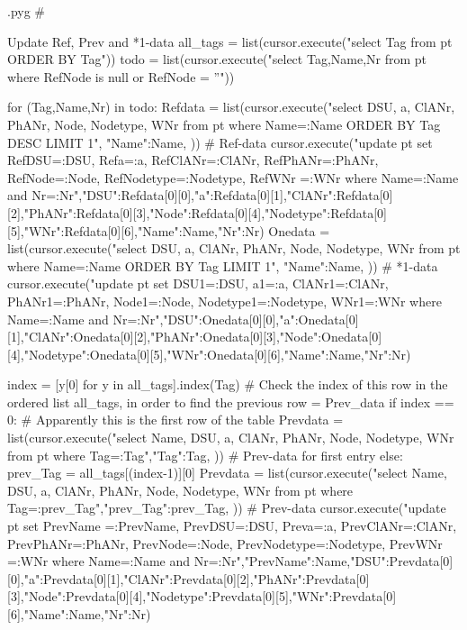 \documentclass{report}
\makeatletter
\newenvironment{python}{%
  \VerbatimEnvironment
  \minted@resetoptions
  \setkeys{minted@opt}{}
      \begin{VerbatimOut}{\jobname.pyg}}
{%
      \end{VerbatimOut}
      \minted@pygmentize{python}
      \DeleteFile{\jobname.pyg}}
\makeatother
\begin{document}
\begin{python}
#{{{ Update Ref, Prev and *1-data
all_tags = list(cursor.execute("select Tag from pt ORDER BY Tag"))
todo = list(cursor.execute("select Tag,Name,Nr from pt where RefNode is null or RefNode = ''"))

for (Tag,Name,Nr) in todo:
    Refdata = list(cursor.execute("select DSU, a, ClANr, PhANr, Node, Nodetype, WNr from pt where Name=:Name ORDER BY Tag DESC LIMIT 1", {"Name":Name, })) # Ref-data
    cursor.execute("update pt set RefDSU=:DSU, Refa=:a, RefClANr=:ClANr, RefPhANr=:PhANr, RefNode=:Node, RefNodetype=:Nodetype, RefWNr =:WNr where Name=:Name and Nr=:Nr",{"DSU":Refdata[0][0],"a":Refdata[0][1],"ClANr":Refdata[0][2],"PhANr":Refdata[0][3],"Node":Refdata[0][4],"Nodetype":Refdata[0][5],"WNr":Refdata[0][6],"Name":Name,"Nr":Nr}) 
    Onedata = list(cursor.execute("select DSU, a, ClANr, PhANr, Node, Nodetype, WNr from pt where Name=:Name ORDER BY Tag LIMIT 1", {"Name":Name, })) # *1-data
    cursor.execute("update pt set DSU1=:DSU, a1=:a, ClANr1=:ClANr, PhANr1=:PhANr, Node1=:Node, Nodetype1=:Nodetype, WNr1=:WNr where Name=:Name and Nr=:Nr",{"DSU":Onedata[0][0],"a":Onedata[0][1],"ClANr":Onedata[0][2],"PhANr":Onedata[0][3],"Node":Onedata[0][4],"Nodetype":Onedata[0][5],"WNr":Onedata[0][6],"Name":Name,"Nr":Nr}) 

    index = [y[0] for y in all_tags].index(Tag)  # Check the index of this row in the ordered list all_tags, in order to find the previous row = Prev_data 
    if index == 0:  # Apparently this is the first row of the table
        Prevdata = list(cursor.execute("select Name, DSU, a, ClANr, PhANr, Node, Nodetype, WNr from pt where Tag=:Tag",{"Tag":Tag, })) # Prev-data for first entry
    else:
        prev_Tag = all_tags[(index-1)][0]
        Prevdata = list(cursor.execute("select Name, DSU, a, ClANr, PhANr, Node, Nodetype, WNr from pt where Tag=:prev_Tag",{"prev_Tag":prev_Tag, })) # Prev-data
    cursor.execute("update pt set PrevName =:PrevName, PrevDSU=:DSU, Preva=:a, PrevClANr=:ClANr, PrevPhANr=:PhANr, PrevNode=:Node, PrevNodetype=:Nodetype, PrevWNr =:WNr where Name=:Name and Nr=:Nr",{"PrevName":Name,"DSU":Prevdata[0][0],"a":Prevdata[0][1],"ClANr":Prevdata[0][2],"PhANr":Prevdata[0][3],"Node":Prevdata[0][4],"Nodetype":Prevdata[0][5],"WNr":Prevdata[0][6],"Name":Name,"Nr":Nr}) 

}}}
\end{python}
\end{document}
